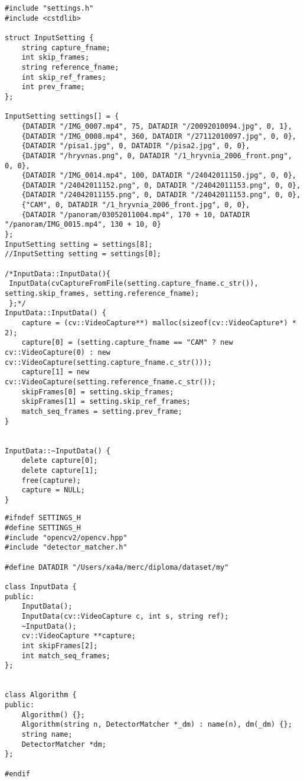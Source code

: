 \begin{lstlisting}
#include "settings.h"
#include <cstdlib>

struct InputSetting {
	string capture_fname;
	int skip_frames;
	string reference_fname;
    int skip_ref_frames;
    int prev_frame;
};

InputSetting settings[] = {
	{DATADIR "/IMG_0007.mp4", 75, DATADIR "/20092010094.jpg", 0, 1},
	{DATADIR "/IMG_0008.mp4", 360, DATADIR "/27112010097.jpg", 0, 0},
    {DATADIR "/pisa1.jpg", 0, DATADIR "/pisa2.jpg", 0, 0},
    {DATADIR "/hryvnas.png", 0, DATADIR "/1_hryvnia_2006_front.png", 0, 0},
    {DATADIR "/IMG_0014.mp4", 100, DATADIR "/24042011150.jpg", 0, 0},
    {DATADIR "/24042011152.png", 0, DATADIR "/24042011153.png", 0, 0},
    {DATADIR "/24042011155.png", 0, DATADIR "/24042011153.png", 0, 0},
	{"CAM", 0, DATADIR "/1_hryvnia_2006_front.jpg", 0, 0},
    {DATADIR "/panoram/03052011004.mp4", 170 + 10, DATADIR "/panoram/IMG_0015.mp4", 130 + 10, 0}
};
InputSetting setting = settings[8];
//InputSetting setting = settings[0];

/*InputData::InputData(){
 InputData(cvCaptureFromFile(setting.capture_fname.c_str()), setting.skip_frames, setting.reference_fname);
 };*/
InputData::InputData() {
    capture = (cv::VideoCapture**) malloc(sizeof(cv::VideoCapture*) * 2);
    capture[0] = (setting.capture_fname == "CAM" ? new cv::VideoCapture(0) : new cv::VideoCapture(setting.capture_fname.c_str()));
    capture[1] = new cv::VideoCapture(setting.reference_fname.c_str());
    skipFrames[0] = setting.skip_frames;
    skipFrames[1] = setting.skip_ref_frames;
    match_seq_frames = setting.prev_frame;
}


InputData::~InputData() {
    delete capture[0];
    delete capture[1];
    free(capture);
    capture = NULL;
}
\end{lstlisting}
\begin{lstlisting}
#ifndef SETTINGS_H
#define SETTINGS_H
#include "opencv2/opencv.hpp"
#include "detector_matcher.h"

#define DATADIR "/Users/xa4a/merc/diploma/dataset/my"

class InputData {
public:
	InputData();
	InputData(cv::VideoCapture c, int s, string ref);
	~InputData();
	cv::VideoCapture **capture;
	int skipFrames[2];
    int match_seq_frames;
};


class Algorithm {
public:
	Algorithm() {};
    Algorithm(string n, DetectorMatcher *_dm) : name(n), dm(_dm) {};
	string name;
	DetectorMatcher *dm;
};

#endif
\end{lstlisting}
